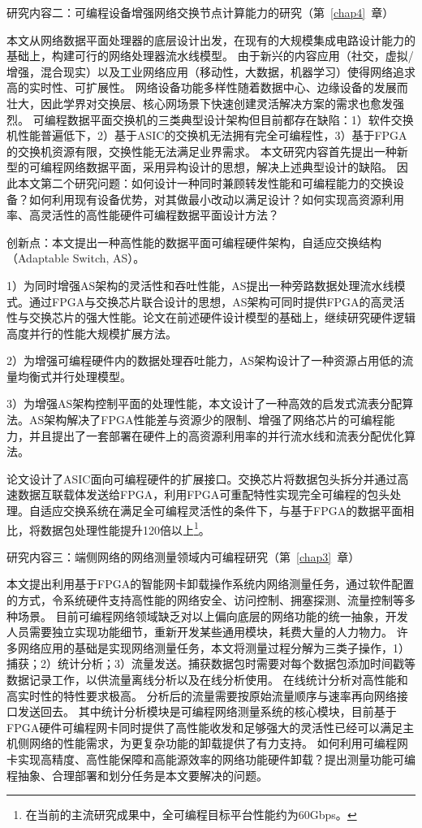 {\hei 研究内容二：可编程设备增强网络交换节点计算能力的研究（第~\ref{chap4}~章）}

{\hei 本文从网络数据平面处理器的底层设计出发，在现有的大规模集成电路设计能力的基础上，构建可行的网络处理器流水线模型。}
由于新兴的内容应用（社交，虚拟/增强，混合现实）以及工业网络应用（移动性，大数据，机器学习）使得网络追求高的实时性、可扩展性。
网络设备功能多样性随着数据中心、边缘设备的发展而壮大，因此学界对交换层、核心网场景下快速创建灵活解决方案的需求也愈发强烈。
可编程数据平面交换机的三类典型设计架构但目前都存在缺陷：1）软件交换机性能普遍低下，2）基于ASIC的交换机无法拥有完全可编程性，3）基于FPGA的交换机资源有限，交换性能无法满足业界需求。
本文研究内容首先提出一种新型的可编程网络数据平面，采用异构设计的思想，解决上述典型设计的缺陷。
因此本文第二个研究问题：如何设计一种同时兼顾转发性能和可编程能力的交换设备？如何利用现有设备优势，对其做最小改动以满足设计？如何实现高资源利用率、高灵活性的高性能硬件可编程数据平面设计方法？

{\hei 创新点：}本文提出一种高性能的数据平面可编程硬件架构，自适应交换结构（Adaptable Switch, AS）。

1）为同时增强AS架构的灵活性和吞吐性能，AS提出一种旁路数据处理流水线模式。通过FPGA与交换芯片联合设计的思想，AS架构可同时提供FPGA的高灵活性与交换芯片的强大性能。论文在前述硬件设计模型的基础上，继续研究硬件逻辑高度并行的性能大规模扩展方法。

2）为增强可编程硬件内的数据处理吞吐能力，AS架构设计了一种资源占用低的流量均衡式并行处理模型。

3）为增强AS架构控制平面的处理性能，本文设计了一种高效的启发式流表分配算法。AS架构解决了FPGA性能差与资源少的限制、增强了网络芯片的可编程能力，并且提出了一套部署在硬件上的高资源利用率的并行流水线和流表分配优化算法。

论文设计了ASIC面向可编程硬件的扩展接口。交换芯片将数据包头拆分并通过高速数据互联载体发送给FPGA，利用FPGA可重配特性实现完全可编程的包头处理。自适应交换系统在满足全可编程灵活性的条件下，与基于FPGA的数据平面相比，将数据包处理性能提升120倍以上\footnote{在当前的主流研究成果中，全可编程目标平台性能约为60Gbps。}。

{\hei 研究内容三：端侧网络的网络测量领域内可编程研究（第~\ref{chap3}~章）}

{\hei 本文提出利用基于FPGA的智能网卡卸载操作系统内网络测量任务，通过软件配置的方式，令系统硬件支持高性能的网络安全、访问控制、拥塞探测、流量控制等多种场景。}
目前可编程网络领域缺乏对以上偏向底层的网络功能的统一抽象，开发人员需要独立实现功能细节，重新开发某些通用模块，耗费大量的人力物力。
许多网络应用的基础是实现网络测量任务，本文将测量过程分解为三类子操作，1）捕获；2）统计分析；3）流量发送。捕获数据包时需要对每个数据包添加时间戳等数据记录工作，以供流量离线分析以及在线分析使用。
在线统计分析对高性能和高实时性的特性要求极高。
分析后的流量需要按原始流量顺序与速率再向网络接口发送回去。
其中统计分析模块是可编程网络测量系统的核心模块，目前基于FPGA硬件可编程网卡同时提供了高性能收发和足够强大的灵活性已经可以满足主机侧网络的性能需求，为更复杂功能的卸载提供了有力支持。
如何利用可编程网卡实现高精度、高性能保障和高能源效率的网络功能硬件卸载？提出测量功能可编程抽象、合理部署和划分任务是本文要解决的问题。


